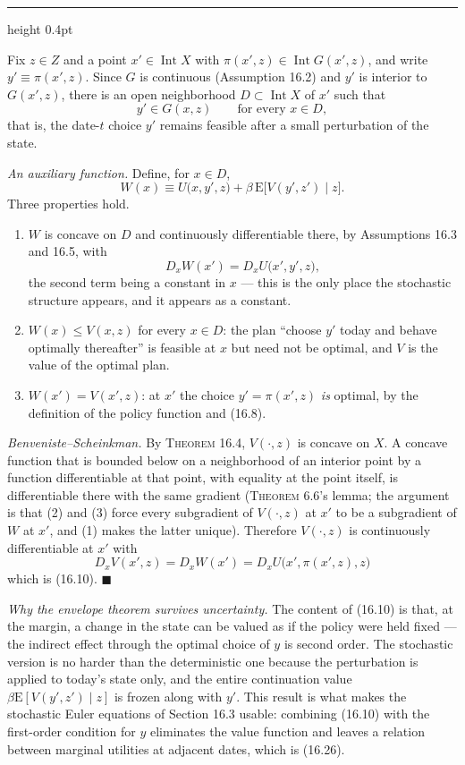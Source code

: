 \documentclass[11pt,letterpaper,reqno]{amsart}
\makeatletter
\newcommand{\E}{\mathrm{E}}                  %
\DeclareMathOperator{\Int}{Int}
\newcommand{\as@head}[3]{%
  \par\addvspace{1.6ex}\penalty-200\relax
  \phantomsection
  \addcontentsline{toc}{subsection}{#1 #2\texorpdfstring{\ifx\relax#3\relax\else\quad #3\fi}{}}%
  {\color{RuleGrey}\hrule height 0.4pt}%
  \nobreak\vspace{0.8ex}\nobreak
  \noindent{\bfseries #1 #2}%
  \ifx\relax#3\relax\else\quad{\bfseries\itshape #3}\fi
  \par\nobreak\vspace{0.4ex}\nobreak
  \as@beginstatement
}
\newcommand{\as@beginstatement}{\begingroup\itshape\ignorespaces}
\newenvironment{aex}[2]{\as@head{Exercise}{#1}{#2}}{\par\addvspace{1.2ex}}
\newcommand{\bk}[1]{\textup{\textsc{#1}}}
\renewcommand{\as@beginstatement}{\ignorespaces}
\makeatother
\begin{document}
\begin{aex}{16.6}{}
Fix $z\in Z$ and a point $x'\in\Int X$ with $\pi(x',z)\in\Int G(x',z)$, and write
$y'\equiv\pi(x',z)$.  Since $G$ is continuous (Assumption 16.2) and $y'$ is interior to
$G(x',z)$, there is an open neighborhood $D\subset\Int X$ of $x'$ such that
\[
y'\in G(x,z)\qquad\text{for every }x\in D ,
\]
that is, the date-$t$ choice $y'$ remains feasible after a small perturbation of the state.

\emph{An auxiliary function.}  Define, for $x\in D$,
\[
W(x)\equiv U\bigl(x,y',z\bigr)+\beta\,\E\bigl[V(y',z')\mid z\bigr] .
\]
Three properties hold.
\begin{enumerate}
\item $W$ is concave on $D$ and continuously differentiable there, by Assumptions 16.3 and 16.5,
      with
      \[
      D_xW(x')=D_xU\bigl(x',y',z\bigr) ,
      \]
      the second term being a constant in $x$ --- this is the only place the stochastic structure
      appears, and it appears as a constant.
\item $W(x)\le V(x,z)$ for every $x\in D$: the plan ``choose $y'$ today and behave optimally
      thereafter'' is feasible at $x$ but need not be optimal, and $V$ is the value of the
      optimal plan.
\item $W(x')=V(x',z)$: at $x'$ the choice $y'=\pi(x',z)$ \emph{is} optimal, by the definition of
      the policy function and \bk{(16.8)}.
\end{enumerate}

\emph{Benveniste--Scheinkman.}  By \bk{Theorem 16.4}, $V(\cdot,z)$ is concave on $X$.  A concave
function that is bounded below on a neighborhood of an interior point by a function differentiable
at that point, with equality at the point itself, is differentiable there with the same gradient
(\bk{Theorem 6.6}'s lemma; the argument is that (2) and (3) force every subgradient of
$V(\cdot,z)$ at $x'$ to be a subgradient of $W$ at $x'$, and (1) makes the latter unique).
Therefore $V(\cdot,z)$ is continuously differentiable at $x'$ with
\[
\boxed{\ D_xV(x',z)=D_xW(x')=D_xU\bigl(x',\pi(x',z),z\bigr)\ }
\]
which is \bk{(16.10)}. $\blacksquare$

\emph{Why the envelope theorem survives uncertainty.}  The content of \bk{(16.10)} is that, at the
margin, a change in the state can be valued as if the policy were held fixed --- the indirect
effect through the optimal choice of $y$ is second order.  The stochastic version is no harder
than the deterministic one because the perturbation is applied to today's state only, and the
entire continuation value $\beta\E[V(y',z')\mid z]$ is frozen along with $y'$.  This result is
what makes the stochastic Euler equations of Section 16.3 usable: combining \bk{(16.10)} with the
first-order condition for $y$ eliminates the value function and leaves a relation between marginal
utilities at adjacent dates, which is \bk{(16.26)}.
\end{aex}
\end{document}
